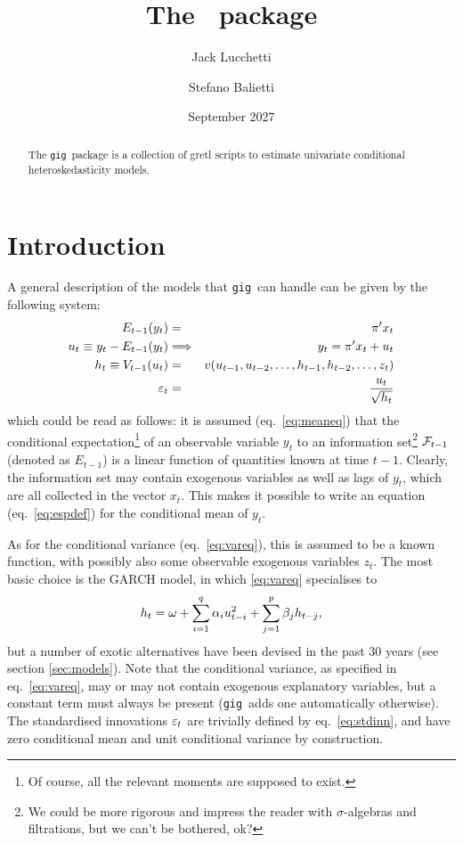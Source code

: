 \documentclass[a4paper,11pt]{article}
\title{The \gig\ package}
\author{Jack Lucchetti \and Stefano Balietti}
\date{September 2027}
\newcommand{\app}[1]{\textsf{#1}}
\newcounter{script}[section]
\newcommand{\stdu}{\ensuremath \varepsilon}
\newcommand{\uhat}{\ensuremath u}
\newcommand{\InfSet}[1]{\ensuremath \mathcal{F}_{#1}}
\newcommand{\gig}{\texttt{gig}}
\begin{document}
\maketitle

\begin{abstract}
The \gig\ package is a collection of \app{gretl} scripts to estimate
univariate conditional heteroskedasticity models. 
\end{abstract}

\tableofcontents

\section{Introduction}

A general description of the models that \gig\ can handle can be given
by the following system:
\begin{eqnarray}
  \label{eq:meaneq}
  E_{t-1}(y_t) & = & \pi'x_t \\
  \label{eq:espdef}
  \uhat_{t} \equiv y_t - E_{t-1}(y_t) & \Longrightarrow &
  y_t = \pi'x_t + \uhat_{t} \\
  \label{eq:vareq}
  h_t \equiv V_{t-1}(\uhat_{t}) & = &
  v(\uhat_{t-1}, \uhat_{t-2}, \ldots,
  h_{t-1}, h_{t-2}, \ldots, z_t) \\
  \label{eq:stdinn}
  \stdu_t & = & \frac{\uhat_{t}}{\sqrt{h_t}}
\end{eqnarray}
which could be read as follows: it is assumed (eq.~\ref{eq:meaneq})
that the conditional expectation\footnote{Of course, all the relevant
  moments are supposed to exist.} of an observable variable $y_t$ to an
information set\footnote{We could be more rigorous and impress the
  reader with $\sigma$-algebras and filtrations, but we can't be
  bothered, ok?}  $\InfSet{t-1}$ (denoted as $E_{t-1}$) is a linear
function of quantities known at time $t-1$. Clearly, the information
set may contain exogenous variables as well as lags of $y_t$, which
are all collected in the vector $x_t$. This makes it possible to write
an equation (eq.~\ref{eq:espdef}) for the conditional mean of $y_t$.

As for the conditional variance (eq.~\ref{eq:vareq}), this is assumed
to be a known function, with possibly also some observable exogenous
variables $z_t$. The most basic choice is the GARCH model, in which
\eqref{eq:vareq} specialises to
\[
  h_t = \omega +  \sum_{i=1}^q \alpha_i \uhat_{t-i}^2 +
  \sum_{j=1}^p\beta_j h_{t-j} ,
\]
but a number of exotic alternatives have been devised in the past 30
years (see section \ref{sec:models}). Note that the conditional
variance, as specified in eq.~\eqref{eq:vareq}, may or may not contain
exogenous explanatory variables, but a constant term must always be
present (\gig\ adds one automatically otherwise). The
standardised innovations $\stdu_t$ are trivially defined by
eq.~\eqref{eq:stdinn}, and have zero conditional mean and unit
conditional variance by construction.
\end{document}
